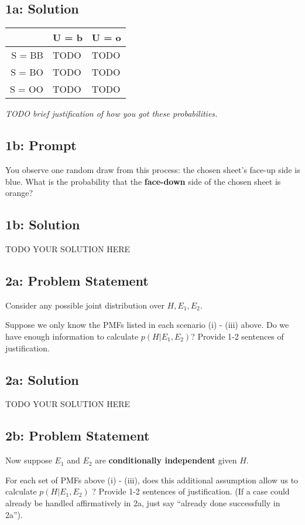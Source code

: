 \documentclass[10pt]{article}
\newcommand{\officialdirections}[1]{{\color{purple} #1}}
\begin{document}
\subsection{1a: Solution}

\begin{tabular}{r | l l}
         &  U = b  & U = o    \\ \hline 
S = BB  &  TODO  & TODO   \\
S = BO  &  TODO  & TODO    \\
S = OO  &  TODO &  TODO
\end{tabular}

\emph{TODO brief justification of how you got these probabilities.}


\newpage
\officialdirections{
\subsection*{1b: Prompt}
You observe one random draw from this process: the chosen sheet's face-up side is blue.
What is the probability that the \textbf{face-down} side of the chosen sheet is orange?
}

\subsection{1b: Solution}
TODO YOUR SOLUTION HERE



\newpage
\officialdirections{
\subsection*{2a: Problem Statement}
Consider any possible joint distribution over $H, E_1, E_2$.

Suppose we only know the PMFs listed in each scenario (i) - (iii) above. Do we have enough information to calculate $p(H | E_1, E_2)$? Provide 1-2 sentences of justification.
}

\subsection{2a: Solution}
TODO YOUR SOLUTION HERE



\newpage
\officialdirections{
\subsection*{2b: Problem Statement}
Now suppose $E_1$ and $E_2$ are \textbf{conditionally independent} given $H$.

For each set of PMFs above (i) - (iii), does this additional assumption allow us to calculate $p(H | E_1, E_2)$ ? Provide 1-2 sentences of justification. (If a case could already be handled affirmatively in 2a, just say ``already done successfully in 2a'').
}
\end{document}
